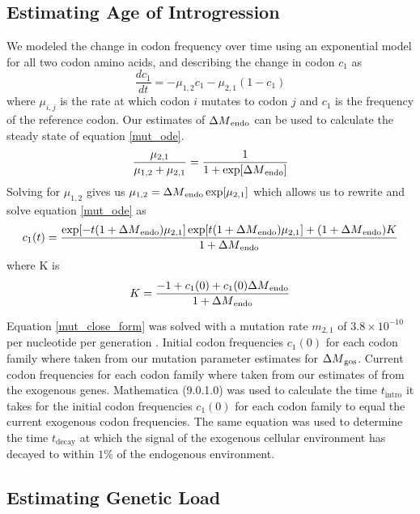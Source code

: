 \subsection{Estimating Age of Introgression}
We modeled the change in codon frequency over time using an exponential model for all two codon amino acids, and describing the change in codon $c_1$ as
\begin{equation}
\frac{d c_1}{d t} = -\mu_{1,2}c_1 - \mu_{2,1}(1-c_1)
\label{mut_ode}
\end{equation}
where $\mu_{i,j}$ is the rate at which codon $i$ mutates to codon $j$ and $c_1$ is the frequency of the reference codon.
Our estimates of ${\Delta M}_\text{endo}$ can be used to calculate the steady state of equation \ref{mut_ode}.
\begin{equation}
\frac{\mu_{2,1}}{\mu_{1,2} + \mu_{2,1}} = \frac{1}{1+\exp[{\Delta M}_\text{endo}]}
\end{equation}
Solving for $\mu_{1,2}$ gives us $\mu_{1,2} = {\Delta M}_\text{endo}\exp[\mu_{2,1}]$ which allows us to rewrite and solve equation \ref{mut_ode} as
\begin{equation}
c_1(t) = \frac{\exp[-t(1+{\Delta M}_\text{endo})\mu_{2,1}]\exp[t(1+{\Delta M}_\text{endo})\mu_{2,1}] + (1+{\Delta M}_\text{endo})K}{1+{\Delta M}_\text{endo}}
\label{mut_close_form}
\end{equation}
where K is
\begin{equation}
K = \frac{-1 + c_1(0) + c_1(0){\Delta M}_\text{endo}}{1+{\Delta M}_\text{endo}}
\end{equation}

Equation \ref{mut_close_form} was solved with a mutation rate $m_{2,1}$ of $3.8\times 10^{-10}$ per nucleotide per generation \citep{lang2008}. 
Initial codon frequencies $c_1(0)$ for each codon family where taken from our mutation parameter estimates for \gossypii ${\Delta M}_\text{gos}$. 
Current codon frequencies for each codon family where taken from our estimates of \DM from the exogenous genes.
Mathematica (9.0.1.0) \citep{Mathematica} was used to calculate the time $t_\text{intro}$ it takes for the initial codon frequencies $c_1(0)$ for each codon family to equal the current exogenous codon frequencies.
The same equation was used to determine the time $t_\text{decay}$ at which the signal of the exogenous cellular environment has decayed to within $1 \%$ of the endogenous environment.

\subsection*{Estimating Genetic Load}


